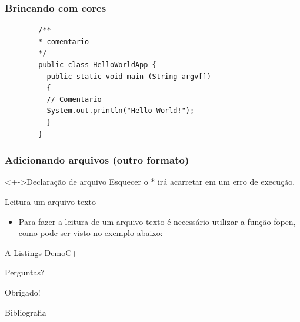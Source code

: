 \documentclass[compress]{beamer}
\begin{document}
\begin{frame}[fragile]{}
    \frametitle{Brincando com cores}
    \begin{verbatim}
        /**
        * comentario
        */
        public class HelloWorldApp {
          public static void main (String argv[])
          {
          // Comentario
          System.out.println("Hello World!");
          }
        }
    \end{verbatim}
    
\end{frame}


\begin{frame}[fragile]{}
    \frametitle{Adicionando arquivos (outro formato)}
    
    \begin{alertblock}<+->{Declaração de arquivo}
        Esquecer o * irá acarretar em um erro de execução.
    \end{alertblock}
\end{frame}

\begin{frame}[fragile]{Leitura um arquivo texto}
    \begin{itemize}
        \vfill \item<+-> Para fazer a leitura de um arquivo texto é necessário utilizar a função fopen, como pode ser visto no exemplo abaixo:
    \end{itemize}  
    
\end{frame}


\begin{frame}[fragile]{A Listings Demo}{C++}
    \lstI
\end{frame}



\begin{frame}[standout]
  Perguntas?
\end{frame}

\begin{frame}
  Obrigado!
\end{frame}

\begin{frame}{Bibliografia}
    
\end{frame}
\end{document}
